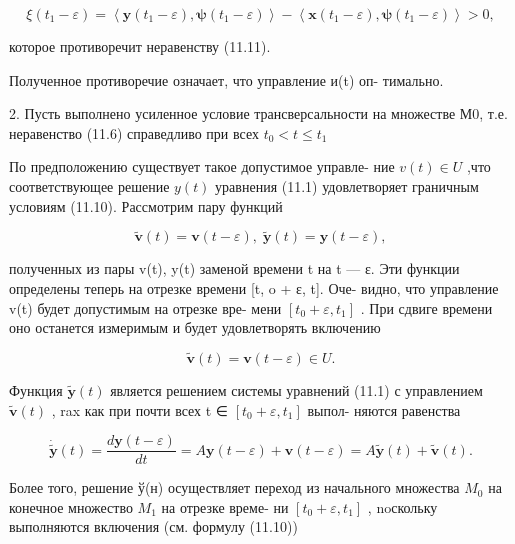 \documentclass[8pt]{extarticle}
\begin{document}
\[
\xi \left( {{t}_{1} - \varepsilon }\right)  = \left\langle  {\mathbf{y}\left( {{t}_{1} - \varepsilon }\right) ,\mathbf{\psi }\left( {{t}_{1} - \varepsilon }\right) }\right\rangle   - \left\langle  {\mathbf{x}\left( {{t}_{1} - \varepsilon }\right) ,\mathbf{\psi }\left( {{t}_{1} - \varepsilon }\right) }\right\rangle   > 0,
\]

которое противоречит неравенству (11.11).

Полученное противоречие означает, что управление и(t) оп- тимально.

2. Пусть выполнено усиленное условие трансверсальности на множестве М0, т.е. неравенство (11.6) справедливо при всех \({t}_{0} < t \leq  {t}_{1}\)

По предположению существует такое допустимое управле- ние \(v\left( t\right)  \in  U\) ,что соответствующее решение \(y\left( t\right)\) уравнения (11.1) удовлетворяет граничным условиям (11.10). Рассмотрим пару функций

\[
\widetilde{\mathbf{v}}\left( t\right)  = \mathbf{v}\left( {t - \varepsilon }\right) ,\;\widetilde{\mathbf{y}}\left( t\right)  = \mathbf{y}\left( {t - \varepsilon }\right) ,
\]

полученных из пары v(t), y(t) заменой времени t на t — ε. Эти функции определены теперь на отрезке времени [t, o + ε, t]. Оче- видно, что управление v(t) будет допустимым на отрезке вре- мени \(\left\lbrack  {{t}_{0} + \varepsilon ,{t}_{1}}\right\rbrack\) . При сдвиге времени оно останется измеримым и будет удовлетворять включению

\[
\widetilde{\mathbf{v}}\left( t\right)  = \mathbf{v}\left( {t - \varepsilon }\right)  \in  U.
\]

Функция \(\widetilde{\mathbf{y}}\left( t\right)\) является решением системы уравнений (11.1) с управлением \(\widetilde{\mathbf{v}}\left( t\right)\) , rax как при почти всех t ∈ \(\left\lbrack  {{t}_{0} + \varepsilon ,{t}_{1}}\right\rbrack\) выпол- няются равенства

\[
\dot{\widetilde{\mathbf{y}}}\left( t\right)  = \frac{d\mathbf{y}\left( {t - \varepsilon }\right) }{dt} = A\mathbf{y}\left( {t - \varepsilon }\right)  + \mathbf{v}\left( {t - \varepsilon }\right)  = A\widetilde{\mathbf{y}}\left( t\right)  + \widetilde{\mathbf{v}}\left( t\right) .
\]

Более того, решение ў(н) осуществляет переход из начального множества \({M}_{0}\) на конечное множество \({M}_{1}\) на отрезке време- ни \(\left\lbrack  {{t}_{0} + \varepsilon ,{t}_{1}}\right\rbrack\) , noскольку выполняются включения (см. формулу (11.10))
\end{document}
